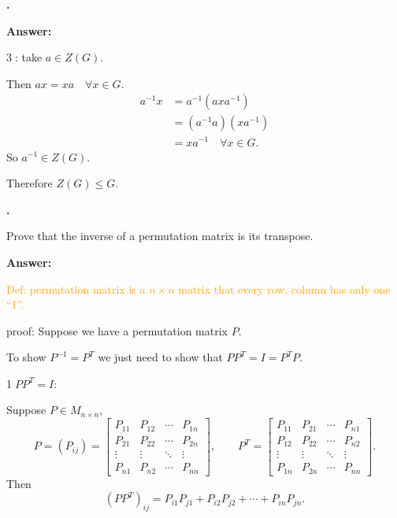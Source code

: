 \documentclass[11pt]{article}
\newcounter{ej}
\renewcommand{\theej}{\textbf{\arabic{ej}.}}
\newenvironment{ej}{
    \stepcounter{ej}
    \begin{list}{\theej}{
        \setlength{\itemindent}{0ex}
        \setlength{\labelwidth}{4ex}
        \setlength{\labelsep}{0.5ex}
        \setlength{\leftmargin}{4ex}
        \setlength{\listparindent}{0ex}
        \setlength{\topsep}{3mm plus 0.5mm minus 0.5mm}
        \setlength{\parsep}{0mm}
        \setlength{\itemsep}{1mm plus 0.3mm minus 0.3mm}
        \setlength{\rightmargin}{0ex}
    }
    \item
}{\end{list}}
\newenvironment{sol}{
    \def\FrameCommand##1{\fcolorbox{black}{gray!20}{##1}}%
    \MakeFramed{\advance\hsize-\width \FrameRestore}%
    \noindent\textbf{Answer:} \ignorespaces
}{\endMakeFramed}
\begin{document}
\begin{ej}
\begin{sol}
            \textcircled{3}: take $a\in Z(G)$.

            Then $ax=xa\quad\forall x\in G$.
            \begin{align*}
                a^{-1}x
                    &=a^{-1}(axa^{-1})\\
                    &=(a^{-1}a)(xa^{-1})\\
                    &=xa^{-1}\quad\forall x\in G.
            \end{align*}
            So $a^{-1}\in Z(G)$.

            Therefore $Z(G)\le G$.
        \end{sol}
    \end{ej}

    \begin{ej}
        Prove that the inverse of a permutation matrix is its transpose.

        \begin{sol}
            \textcolor{orange}{Def: permutation matrix is a $n\times n$ matrix
            that every row, column has only one ``1''.}

            proof: Suppose we have a permutation matrix $P$.

            To show $P^{-1}=P^T$ we just need to show that
            $PP^T=I=P^TP$.

            \textcircled{1}\quad $PP^T=I$:

            Suppose $P\in M_{n\times n}$,
            \[
                P=(P_{ij})=
                \begin{bmatrix}
                    P_{11}&P_{12}&\cdots&P_{1n}\\
                    P_{21}&P_{22}&\cdots&P_{2n}\\
                    \vdots&\vdots&\ddots&\vdots\\
                    P_{n1}&P_{n2}&\cdots&P_{nn}
                \end{bmatrix},
                \qquad
                P^T=
                \begin{bmatrix}
                    P_{11}&P_{21}&\cdots&P_{n1}\\
                    P_{12}&P_{22}&\cdots&P_{n2}\\
                    \vdots&\vdots&\ddots&\vdots\\
                    P_{1n}&P_{2n}&\cdots&P_{nn}
                \end{bmatrix}.
            \]
            Then
            \[
                (PP^T)_{ij}=P_{i1}P_{j1}+P_{i2}P_{j2}+\cdots+P_{in}P_{jn}.
            \]


\end{sol}
\end{ej}
\end{document}
